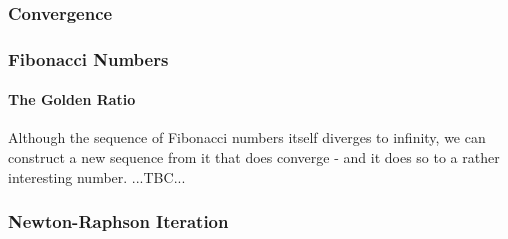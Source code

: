 


\subsubsection{Convergence}

\subsubsection{Fibonacci Numbers}



\paragraph{The Golden Ratio}
Although the sequence of Fibonacci numbers itself diverges to infinity, we can construct a new sequence from it that does converge - and it does so to a rather interesting number. ...TBC...


\subsubsection{Newton-Raphson Iteration}





